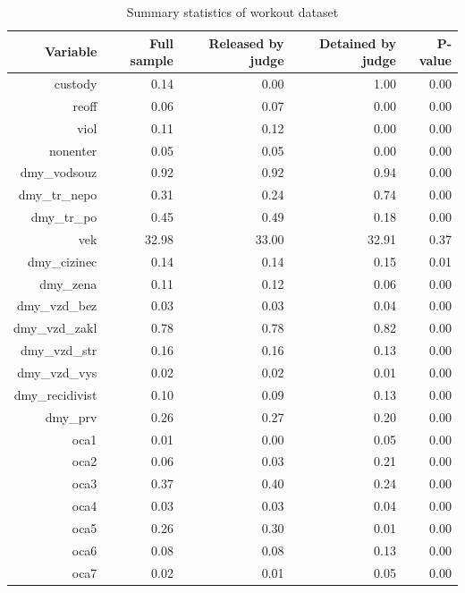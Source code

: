 \documentclass[12pt, twoside]{book} %
\begin{document}
\begin{table}[H]
\centering
\begin{tabular}{rrrrr}
  \hline
Variable & Full sample & Released by judge & Detained by judge & P-value \\ 
  \hline
custody & 0.14 & 0.00 & 1.00 & 0.00 \\ 
  reoff & 0.06 & 0.07 & 0.00 & 0.00 \\ 
  viol & 0.11 & 0.12 & 0.00 & 0.00 \\ 
  nonenter & 0.05 & 0.05 & 0.00 & 0.00 \\ 
  dmy\_vodsouz & 0.92 & 0.92 & 0.94 & 0.00 \\ 
  dmy\_tr\_nepo & 0.31 & 0.24 & 0.74 & 0.00 \\ 
  dmy\_tr\_po & 0.45 & 0.49 & 0.18 & 0.00 \\ 
  vek & 32.98 & 33.00 & 32.91 & 0.37 \\ 
  dmy\_cizinec & 0.14 & 0.14 & 0.15 & 0.01 \\ 
  dmy\_zena & 0.11 & 0.12 & 0.06 & 0.00 \\ 
  dmy\_vzd\_bez & 0.03 & 0.03 & 0.04 & 0.00 \\ 
  dmy\_vzd\_zakl & 0.78 & 0.78 & 0.82 & 0.00 \\ 
  dmy\_vzd\_str & 0.16 & 0.16 & 0.13 & 0.00 \\ 
  dmy\_vzd\_vys & 0.02 & 0.02 & 0.01 & 0.00 \\ 
  dmy\_recidivist & 0.10 & 0.09 & 0.13 & 0.00 \\ 
  dmy\_prv & 0.26 & 0.27 & 0.20 & 0.00 \\ 
  oca1 & 0.01 & 0.00 & 0.05 & 0.00 \\ 
  oca2 & 0.06 & 0.03 & 0.21 & 0.00 \\ 
  oca3 & 0.37 & 0.40 & 0.24 & 0.00 \\ 
  oca4 & 0.03 & 0.03 & 0.04 & 0.00 \\ 
  oca5 & 0.26 & 0.30 & 0.01 & 0.00 \\ 
  oca6 & 0.08 & 0.08 & 0.13 & 0.00 \\ 
  oca7 & 0.02 & 0.01 & 0.05 & 0.00 \\ 
   \hline
\end{tabular}

 \caption{Summary statistics of workout dataset}
\medskip
{\small {}}

\end{table}
\end{document}

